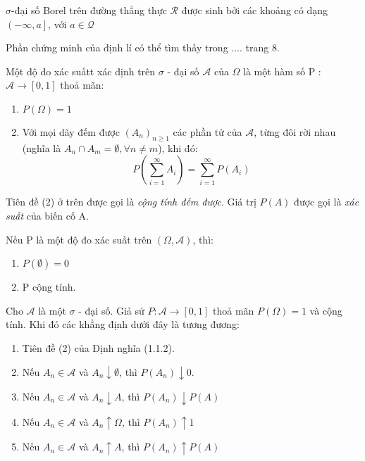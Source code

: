 \begin{DL}
	$\sigma$-đại số Borel trên đường thẳng thực $\mathcal{R}$ được sinh bởi các khoảng có dạng $\left( -\infty, a \right]$, với $a \in \mathcal{Q}$
	\end{DL}

\begin{CM}
	Phần chứng minh của định lí có thể tìm thấy trong .... trang 8.
	\end{CM}

\begin{DN}
	Một độ đo xác suấtt xác định trên $\sigma$ - đại số  $\mathscr{A}$ của $\Omega$ là một hàm số P : $\mathscr{A} \rightarrow [0,1]$ thoả mãn:
	\begin{enumerate}[\qquad 1{)}]
		\item $P(\Omega) = 1$
		\item Với mọi dãy đếm được $\left(A_n \right) _{n\ge 1}$ các phần tử của $\mathscr{A}$, từng đôi rời nhau (nghĩa là $A_n \cap A_m = \emptyset, \forall n \ne m$), khi đó:
		\[ P \left( \sum_{i = 1}^{\infty}A_i\right)=\sum_{i = 1}^{\infty} P \left(A_i\right) \]
		
	\end{enumerate}
\end{DN}

Tiên đề (2) ở trên được gọi là \textit{cộng tính đếm được}. Giá trị $P \left(A \right)$ được gọi là \textit{xác suất} của biến cố A.

\begin{DL}
	Nếu P là một độ đo xác suất trên $\left( \Omega, \mathscr{A} \right)$, thì:
	\begin{enumerate}[\qquad i {)}]
		\item $P \left(\emptyset \right) = 0$
		\item P cộng tính.
		\end{enumerate}
	\end{DL}

\begin{DL}
	Cho $\mathscr{A} $ là một $\sigma$ - đại số. Giả sử $P : \mathscr{A} \rightarrow [0, 1]$ thoả mãn $P \left( \Omega \right) = 1$ và cộng tính. Khi đó các khẳng định dưới đây là tương đương:
	\begin{enumerate}[\qquad i {)}]
		
		\item Tiên đề (2) của Định nghĩa (1.1.2).
		\item Nếu $A_n \in \mathscr{A}$ và $A_n \downarrow \emptyset$, thì $P \left( A_n \right) \downarrow 0.$
		\item Nếu $A_n \in \mathscr{A}$ và $A_n \downarrow A$, thì $P \left( A_n \right) \downarrow P \left( A \right)$
		\item Nếu $A_n \in \mathscr{A}$ và $A_n \uparrow \Omega $, thì $P \left( A_n \right) \uparrow 1$
		\item Nếu $A_n \in \mathscr{A}$ và $A_n \uparrow A$, thì $P \left( A_n \right) \uparrow P \left( A \right)$
			
	\end{enumerate}
\end{DL}

